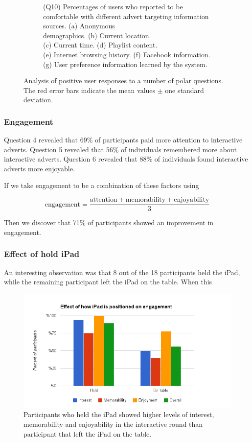 \begin{figure}[!ht]
\begin{subfigure}[t]{0.49\textwidth}
			\caption{(Q10) Percentages of users who reported to be comfortable with different advert targeting information sources. (a) Anonymous \\demographics. (b) Current location. \\(c) Current time. (d) Playlist content. \\(e) Internet browsing history. (f) Facebook information. (g) User preference information learned by the system.}
		\end{subfigure}
		\caption{Analysis of positive user responses to a number of polar questions. The red error bars indicate the mean values $\pm$ one standard deviation.}
		\label{fig:qualitative_results}
	\end{figure}


	\subsubsection{Engagement}

	Question 4 revealed that 69\% of participants paid more attention to interactive adverts. Question 5 revealed that 56\% of individuals remembered more about interactive adverts. Question 6 revealed that 88\% of individuals found interactive adverts more enjoyable. 

	If we take engagement to be a combination of these factors using

	$$
	\text{engagement} = \frac{\text{attention} + \text{memorability} + \text{enjoyability}}{3}
	$$

	Then we discover that 71\% of participants showed an improvement in engagement.


	\subsubsection{Effect of hold iPad}

	An interesting observation was that 8 out of the 18 participants held the iPad, while the remaining participant left the iPad on the table. When this 

	\begin{figure}[!ht]
		\centering
		\includegraphics[width=\textwidth]{images/ipad_held.png}
		\caption{Participants who held the iPad showed higher levels of interest, memorability and enjoyability in the interactive round than participant that left the iPad on the table.}
		\label{fig:held}
	\end{figure}

